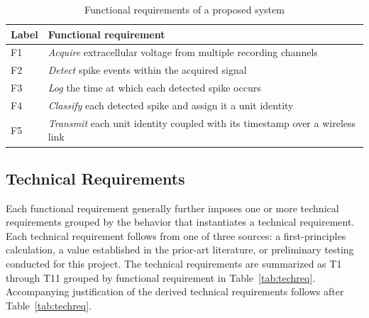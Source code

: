 \documentclass[11pt]{article}
\begin{document}
\begin{table}[H]
\centering
\caption{Functional requirements of a proposed system}
\label{tab:funcreq}
{\footnotesize
\setlength{\tabcolsep}{4pt}
\renewcommand{\arraystretch}{1.25}
\begin{tabularx}{\textwidth}{@{}l L@{}}
\toprule
Label & Functional requirement \\
\midrule
F1 & \emph{Acquire} extracellular voltage from multiple recording channels \\
F2 & \emph{Detect} spike events within the acquired signal \\
F3 & \emph{Log} the time at which each detected spike occurs \\
F4 & \emph{Classify} each detected spike and assign it a unit identity \\
F5 & \emph{Transmit} each unit identity coupled with its timestamp over a wireless link \\
\bottomrule
\end{tabularx}
}
\end{table}

\subsection{Technical Requirements}
Each functional requirement generally further imposes one or more technical requirements
grouped by the behavior that instantiates a technical requirement. Each technical
requirement follows from one of three sources: a first-principles calculation, a value
established in the prior-art literature, or preliminary testing conducted for this
project. The technical requirements are summarized as T1 through T11 grouped by functional
requirement in Table~\ref{tab:techreq}. Accompanying justification of the derived technical
requirements follows after Table~\ref{tab:techreq}.
\end{document}
